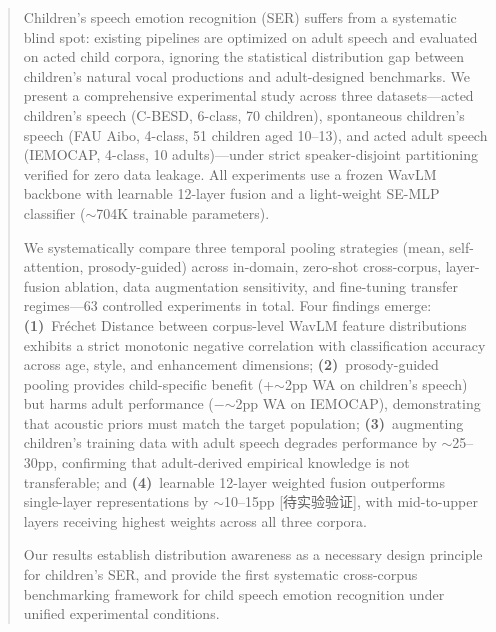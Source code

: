
\begin{abstract}
Children's speech emotion recognition (SER) suffers from a systematic blind
spot: existing pipelines are optimized on adult speech and evaluated on acted
child corpora, ignoring the statistical distribution gap between children's
natural vocal productions and adult-designed benchmarks. We present a
comprehensive experimental study across three datasets---acted children's
speech (C-BESD, 6-class, 70 children), spontaneous children's speech (FAU
Aibo, 4-class, 51 children aged 10--13), and acted adult speech (IEMOCAP,
4-class, 10 adults)---under strict speaker-disjoint partitioning verified for
zero data leakage. All experiments use a frozen WavLM backbone with learnable
12-layer fusion and a light-weight SE-MLP classifier ($\sim$704K trainable
parameters).

We systematically compare three temporal pooling strategies (mean, self-attention,
prosody-guided) across in-domain, zero-shot cross-corpus, layer-fusion ablation,
data augmentation sensitivity, and fine-tuning transfer regimes---63 controlled
experiments in total. Four findings emerge: \textbf{(1)}~Fr\'{e}chet Distance
between corpus-level WavLM feature distributions exhibits a strict monotonic
negative correlation with classification accuracy across age, style, and
enhancement dimensions; \textbf{(2)}~prosody-guided pooling provides
child-specific benefit (+$\sim$2pp WA on children's speech) but harms adult
performance ($-$$\sim$2pp WA on IEMOCAP), demonstrating that acoustic priors
must match the target population; \textbf{(3)}~augmenting children's training
data with adult speech degrades performance by $\sim$25--30pp, confirming
that adult-derived empirical knowledge is not transferable; and
\textbf{(4)}~learnable 12-layer weighted fusion outperforms single-layer
representations by $\sim$10--15pp [待实验验证], with mid-to-upper layers
receiving highest weights across all three corpora.

Our results establish distribution awareness as a necessary design principle
for children's SER, and provide the first systematic cross-corpus benchmarking
framework for child speech emotion recognition under unified experimental
conditions.
\end{abstract}
